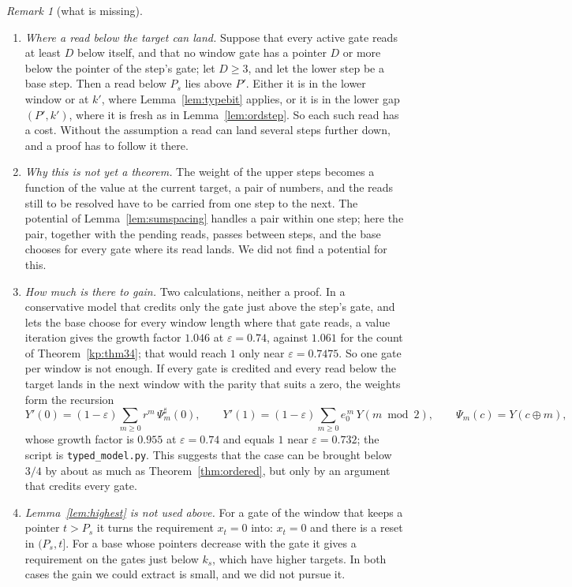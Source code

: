 \documentclass[11pt]{amsart}
\theoremstyle{definition}
\theoremstyle{remark}
\newtheorem{remark}[theorem]{Remark}
\newcommand{\eps}{\varepsilon}
\begin{document}
\begin{remark}[what is missing]\label{rem:below}
\begin{enumerate}[label=(\roman*),leftmargin=2.4em]
\item \emph{Where a read below the target can land.} Suppose that every active gate reads at
least $D$ below itself, and that no window gate has a pointer $D$ or more below the pointer of
the step's gate; let $D\ge3$, and let the lower step be a base step. Then a read below $P_s$ lies
above $P'$. Either it is in the lower window or at $k'$, where Lemma~\ref{lem:typebit} applies,
or it is in the lower gap $(P',k')$, where it is fresh as in Lemma~\ref{lem:ordstep}. So each such read has a cost. Without the assumption a read can land
several steps further down, and a proof has to follow it there.
\item \emph{Why this is not yet a theorem.} The weight of the upper steps becomes a function of
the value at the current target, a pair of numbers, and the reads still to be resolved have to
be carried from one step to the next. The potential of Lemma~\ref{lem:sumspacing} handles a pair
within one step; here the pair, together with the pending reads, passes between steps, and the
base chooses for every gate where its read lands. We did not find a potential for this.
\item \emph{How much is there to gain.} Two calculations, neither a proof. In a conservative
model that credits only the gate just above the step's gate, and lets the base choose for every
window length where that gate reads, a value iteration gives the growth factor $1.046$ at
$\eps=0.74$, against $1.061$ for the count of Theorem~\ref{kp:thm34}; that would reach $1$ only near $\eps=0.7475$.
So one gate per window is not enough. If every gate is credited and every read below the target
lands in the next window with the parity that suits a zero, the weights form the recursion
\[
Y'(0)=(1-\eps)\sum_{m\ge0}r^m\,\Psi_m^\sharp(0),\qquad Y'(1)=(1-\eps)\sum_{m\ge0}e_0^{\,m}\,Y(m\bmod2),
\qquad\Psi_m(c)=Y(c\oplus m),
\]
whose growth factor is $0.955$ at $\eps=0.74$ and equals $1$ near $\eps=0.732$; the script is
\texttt{typed\_model.py}. This suggests that the case can be brought below $3/4$ by about as
much as Theorem~\ref{thm:ordered}, but only by an argument that credits every gate.
\item \emph{Lemma~\ref{lem:highest} is not used above.} For a gate of the window that keeps a
pointer $t>P_s$ it turns the requirement $x_t=0$ into: $x_t=0$ and there is a reset in $(P_s,t]$.
For a base whose pointers decrease with the gate it gives a requirement on the gates just below
$k_s$, which have higher targets. In both cases the gain we could extract is small, and we did
not pursue it.
\end{enumerate}
\end{remark}
\end{document}
